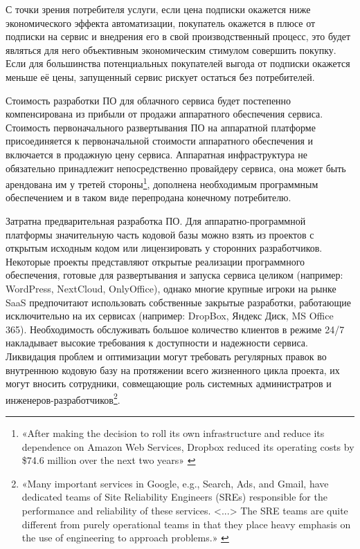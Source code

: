 \documentclass{article}
\begin{document}
С точки зрения потребителя услуги, если цена подписки окажется ниже экономического эффекта автоматизации, покупатель окажется в плюсе от подписки на сервис и внедрения его в свой производственный процесс, это будет являться для него объективным экономическим стимулом совершить покупку. Если для большинства потенциальных покупателей выгода от подписки окажется меньше её цены, запущенный сервис рискует остаться без потребителей.

Стоимость разработки ПО для облачного сервиса будет постепенно компенсирована из прибыли от продажи аппаратного обеспечения сервиса. Стоимость первоначального развертывания ПО на аппаратной платформе присоединяется к первоначальной стоимости аппаратного обеспечения и включается в продажную цену сервиса. Аппаратная инфраструктура не обязательно принадлежит непосредственно провайдеру сервиса, она может быть арендована им у третей стороны\footnote{«After making the decision to roll its own infrastructure and reduce its dependence on Amazon Web Services, Dropbox reduced its operating costs by \$74.6 million over the next two years» \cite{dropboxBuildsOwnInfra}}, дополнена необходимым программным обеспечением и в таком виде перепродана конечному потребителю.

Затратна предварительная разработка ПО. Для аппаратно-программной платформы значительную часть кодовой базы можно взять из проектов с открытым исходным кодом или лицензировать у сторонних разработчиков. Некоторые проекты представляют открытые реализации программного обеспечения, готовые для развертывания и запуска сервиса целиком (например: WordPress, NextCloud, OnlyOffice), однако многие крупные игроки на рынке SaaS предпочитают использовать собственные закрытые разработки, работающие исключительно на их сервисах (например: DropBox, Яндекс Диск, MS Office 365). Необходимость обслуживать большое количество клиентов в режиме 24/7 накладывает высокие требования к доступности и надежности сервиса. Ликвидация проблем и оптимизации могут требовать регулярных правок во внутреннюю кодовую базу на протяжении всего жизненного цикла проекта, их могут вносить сотрудники, совмещающие роль системных администратров и инженеров-разработчиков\footnote{«Many important services in Google, e.g., Search, Ads, and Gmail, have dedicated teams of Site Reliability Engineers (SREs) responsible for the performance and reliability of these services. <...> The SRE teams are quite different from purely operational teams in that they place heavy emphasis on the use of engineering to approach problems.» \cite{googleSRE}}.
\end{document}
